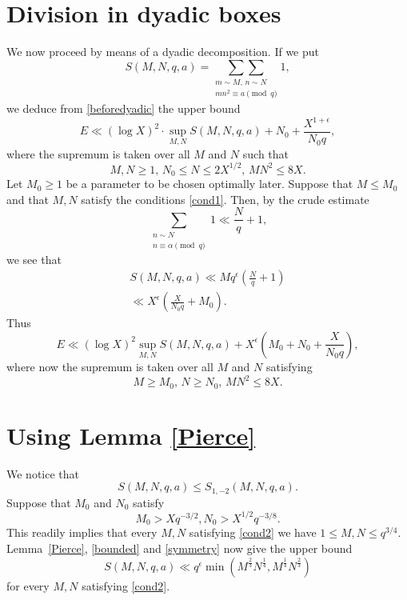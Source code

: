 \documentclass[a4paper, 11pt]{amsart}
\theoremstyle{plain}
\theoremstyle{definition}
\newcommand{\rmod}{\!\!\!\!\pmod}
\begin{document}
\section{Division in dyadic boxes}
%
We now proceed by means of a dyadic decomposition. If we put
%
\begin{equation}\label{SV}
S(M,N,q,a)=\underset{\substack{m\sim M,\,n\sim N\\ mn^2\equiv a\rmod{q}}}{\sum\sum}1,
\end{equation}
we deduce from \eqref{beforedyadic} the upper bound
%
$$
E\ll (\log X)^2\cdot \sup_{M,N}S\left(M,N,q,a\right) + N_0 + \frac{X^{1+\epsilon}}{N_0 q},
$$
where the supremum is taken over all $M$ and $N$ such that
%
\begin{equation}\label{cond1}
M,N\geq 1,\, N_0\leq N\leq 2X^{1/2},\,MN^2\leq 8X.
\end{equation}
%
Let $M_0\geq 1$ be a parameter to be chosen optimally later. Suppose that $M\leq M_0$ and that $M,N$ satisfy the conditions \eqref{cond1}. Then, by the crude estimate 
$$
\sum_{\substack{n\sim N\\n \equiv \alpha\rmod{q}}}1\ll \frac{N}{q} + 1,
$$
%
we see that
%
\begin{align*}
S(M,N,q,a)\ll Mq^{\epsilon}\left(\frac{N}{q}+1\right)\\
\ll X^{\epsilon}\left(\frac{X}{N_0 q} + M_0\right).
\end{align*}
%
Thus
%
\begin{equation}\label{E-sup}
E\ll (\log X)^2\sup_{M,N}S\left(M,N,q,a\right) + X^{\epsilon}\left(M_0 + N_0 + \frac{X}{N_0 q}\right),
\end{equation}
where now the supremum is taken over all $M$ and $N$ satisfying
% 
\begin{equation}\label{cond2}
M\geq M_0,\, N\geq N_0,\, MN^2\leq 8X.
\end{equation}
%
\section{Using Lemma \ref{Pierce}}
%
We notice that
\begin{equation}\label{bounded}
S(M,N,q,a)\leq S_{1,-2}(M,N,q,a).
\end{equation}
%
Suppose that $M_0$ and $N_0$ satisfy
%
\begin{equation}\label{toverify}
M_0> Xq^{-3/2}, N_0> X^{1/2}q^{-3/8}.    
\end{equation}
%
This readily implies that every $M,N$ satisfying \eqref{cond2} we have $1\leq M,N\leq q^{3/4}$. Lemma~\ref{Pierce}, \eqref{bounded} and \eqref{symmetry} now give the upper bound
%
\begin{equation}\label{min}
S(M,N,q,a)\ll q^{\epsilon}\min\left(M^{\frac{2}{3}}N^{\frac{1}{4}},M^{\frac{1}{4}}N^{\frac{2}{3}}\right)
\end{equation}
for every $M,N$ satisfying \eqref{cond2}.
\end{document}
